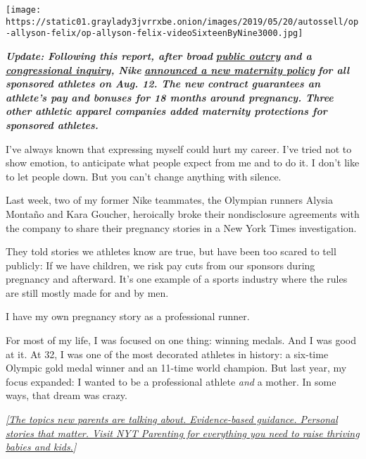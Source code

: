 \texttt{[image: https://static01.graylady3jvrrxbe.onion/images/2019/05/20/autossell/op-allyson-felix/op-allyson-felix-videoSixteenByNine3000.jpg]}

\emph{\textbf{Update: Following this report, after broad}}
\textbf{\href{mailto:https://www.si.com/olympics/2019/05/24/nike-maternity-protection-sponsorships-contract-allyson-felix-alysia-montano}{\emph{public
outcry}}} \emph{\textbf{and a}}
\textbf{\href{mailto:https://herrerabeutler.house.gov/uploadedfiles/05_17_19_letter_to_nike.pdf}{\emph{congressional
inquiry}}\emph{, Nike}}
\textbf{\href{https://www.washingtonpost.com/sports/2019/08/16/under-fire-nike-expands-protections-pregnant-athletes/}{\emph{announced
a new maternity policy}}} \emph{\textbf{for all sponsored athletes on
Aug. 12. The new contract guarantees an athlete's pay and bonuses for 18
months around pregnancy. Three other athletic apparel companies added
maternity protections for sponsored athletes.}}

I've always known that expressing myself could hurt my career. I've
tried not to show emotion, to anticipate what people expect from me and
to do it. I don't like to let people down. But you can't change anything
with silence.

Last week, two of my former Nike teammates, the Olympian runners Alysia
Montaño and Kara Goucher, heroically broke their nondisclosure
agreements with the company to share their pregnancy stories in a New
York Times investigation.

They told stories we athletes know are true, but have been too scared to
tell publicly: If we have children, we risk pay cuts from our sponsors
during pregnancy and afterward. It's one example of a sports industry
where the rules are still mostly made for and by men.

I have my own pregnancy story as a professional runner.

For most of my life, I was focused on one thing: winning medals. And I
was good at it. At 32, I was one of the most decorated athletes in
history: a six-time Olympic gold medal winner and an 11-time world
champion. But last year, my focus expanded: I wanted to be a
professional athlete \emph{and} a mother. In some ways, that dream was
crazy.

\href{https://parenting.nytimes3xbfgragh.onion/}{\emph{{[}The topics new
parents are talking about. Evidence-based guidance. Personal stories
that matter. Visit NYT Parenting for everything you need to raise
thriving babies and kids.}}\emph{{]}}

